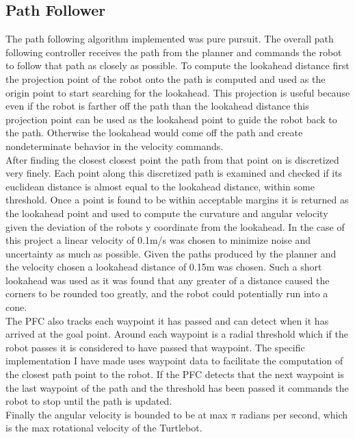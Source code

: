 \documentclass[letterpaper,12pt]{article}
\begin{document}
\subsection{Path Follower}
The path following algorithm implemented was pure pursuit. The overall path following controller receives the path from the planner and commands the robot to follow that path as closely as possible. To compute the lookahead distance first the projection point of the robot onto the path is computed and used as the origin point to start searching for the lookahead. This projection is useful because even if the robot is farther off the path than the lookahead distance this projection point can be used as the lookahead point to guide the robot back to the path. Otherwise the lookahead would come off the path and create nondeterminate behavior in the velocity commands. 
\\
After finding the closest closest point the path from that point on is discretized very finely. Each point along this discretized path is examined and checked if its euclidean distance is almost equal to the lookahead distance, within some threshold. Once a point is found to be within acceptable margins it is returned as the lookahead point and used to compute the curvature and angular velocity given the deviation of the robots y coordinate from the lookahead. In the case of this project a linear velocity of 0.1m/s was chosen to minimize noise and uncertainty as much as possible. Given the paths produced by the planner and the velocity chosen a lookahead distance of 0.15m was chosen. Such a short lookahead was used as it was found that any greater of a distance caused the corners to be rounded too greatly, and the robot could potentially run into a cone. 
\\
The PFC also tracks each waypoint it has passed and can detect when it has arrived at the goal point. Around each waypoint is a radial threshold which if the robot passes it is considered to have passed that waypoint. The specific implementation I have made uses waypoint data to facilitate the computation of the closest path point to the robot. If the PFC detects that the next waypoint is the last waypoint of the path and the threshold has been passed it commands the robot to stop until the path is updated. 
\\ 
Finally the angular velocity is bounded to be at max $\pi$ radians per second, which is the max rotational velocity of the Turtlebot. 
\end{document}
